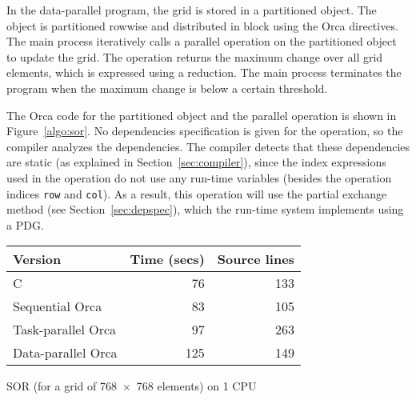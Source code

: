 \documentclass{acmtrans2e}
\begin{document}

In the data-parallel program, the grid is stored in a partitioned
object. The object is partitioned rowwise and distributed in block
using the Orca directives. The main process iteratively calls a
parallel operation on the partitioned object to update the grid.
The operation returns the maximum change over all grid elements,
which is expressed using a reduction. The main process terminates
the program when the maximum change is below a certain threshold.

The Orca code for the partitioned object and the parallel operation
is shown in Figure~\ref{algo:sor}.
No dependencies specification is given for the operation, so the
compiler analyzes the dependencies. The compiler
detects that these dependencies are static (as explained
in Section~\ref{sec:compiler}), since the index expressions
used in the operation do not use any run-time variables (besides
the operation indices \verb+row+ and \verb+col+).
As a result, this operation will use the partial exchange method
(see Section~\ref{sec:depspec}),
which the run-time system implements using a PDG.


\begin{acmtable}{8cm}
\centering
\begin{tabular*}{8cm}{@{\extracolsep\fill}l|r r}
{\bf Version} & {\bf Time (secs)} & {\bf Source lines} \\
\hline
C & 76 & 133 \\
Sequential Orca & 83 & 105 \\
Task-parallel Orca & 97 & 263 \\
Data-parallel Orca & 125 & 149 \\
\end{tabular*}
\caption{SOR (for a grid of 768~$\times$~768 elements) on 1 CPU}
\label{table:sor}
\end{acmtable}
\end{document}
